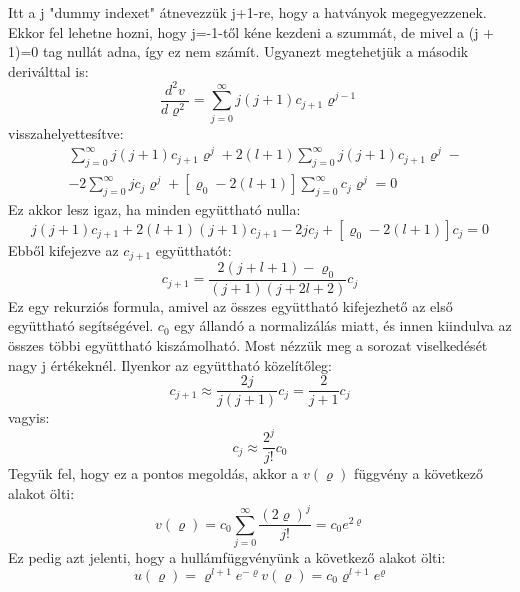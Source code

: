 \documentclass[../main.tex]{subfiles}
\begin{document}
Itt a j "dummy indexet" átnevezzük j+1-re, hogy a hatványok megegyezzenek. Ekkor fel lehetne hozni, hogy j=-1-től kéne kezdeni a szummát,
de mivel a (j + 1)=0 tag nullát adna, így ez nem számít. Ugyanezt megtehetjük a második deriválttal is:
\begin{equation}
    \frac{d^2 v}{d \varrho^2} = \sum_{j=0}^{\infty} j (j + 1) c_{j + 1} \varrho^{j - 1}
\end{equation}
visszahelyettesítve:
\begin{equation}
    \begin{aligned}
        & \sum_{j=0}^{\infty} j(j+1)c_{j+1} \varrho^{j} + 2(l + 1) \sum_{j=0}^{\infty} j(j + 1) c_{j + 1} \varrho^{j} - \\
        & - 2 \sum_{j=0}^{\infty} j c_j \varrho^{j} + [\varrho_0 - 2(l + 1)] \sum_{j=0}^{\infty} c_j \varrho^j = 0
    \end{aligned}
\end{equation}
Ez akkor lesz igaz, ha minden együttható nulla:
\begin{equation}
    j(j + 1) c_{j + 1} + 2(l + 1) (j + 1) c_{j + 1} - 2 j c_j + [\varrho_0 - 2(l + 1)] c_j = 0
\end{equation}
Ebből kifejezve az $c_{j + 1}$ együtthatót:
\begin{equation}
    c_{j + 1} = \frac{2(j + l + 1) - \varrho_0}{(j + 1)(j + 2l + 2)} c_j
\end{equation}
Ez egy rekurziós formula, amivel az összes együttható kifejezhető az első együttható segítségével. $c_0$ egy állandó a normalizálás miatt, 
és innen kiindulva az összes többi együttható kiszámolható. Most nézzük meg a sorozat viselkedését nagy j értékeknél. Ilyenkor az együttható közelítőleg:
\begin{equation}
    c_{j + 1} \approx \frac{2j}{j(j+1)}c_j = \frac{2}{j + 1} c_j
\end{equation}
vagyis:
\begin{equation}
    c_j \approx \frac{2^j}{j!} c_0
\end{equation}
Tegyük fel, hogy ez a pontos megoldás, akkor a $v(\varrho)$ függvény a következő alakot ölti:
\begin{equation}
    v(\varrho) = c_0 \sum_{j=0}^{\infty} \frac{(2 \varrho)^j}{j!} = c_0 e^{2 \varrho}
\end{equation}
Ez pedig azt jelenti, hogy a hullámfüggvényünk a következő alakot ölti:
\begin{equation}
    u(\varrho) = \varrho^{l + 1} e^{-\varrho} v(\varrho) = c_0 \varrho^{l + 1} e^{\varrho}
\end{equation}
\end{document}
